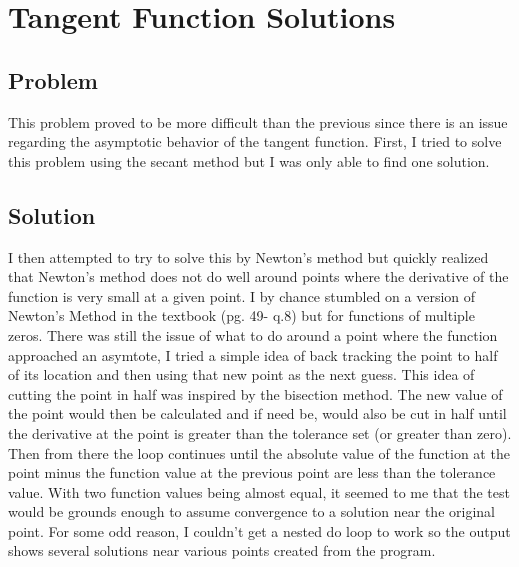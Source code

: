 \documentclass[12pt]{article}
\begin{document}
\section{Tangent Function Solutions}
\subsection{Problem}
This problem proved to be more difficult than the previous since there is an issue regarding the asymptotic behavior of the tangent function. First, I tried to solve this problem using the secant method but I was only able to find one solution. 
\subsection{Solution}
I then attempted to try to solve this by Newton's method but quickly realized that Newton's method does not do well around points where the derivative of the function is very small at a given point. I by chance stumbled on a version of Newton's Method in the textbook (pg. 49- q.8) but for functions of multiple zeros. There was still the issue of what to do around a point where the function approached an asymtote, I tried a simple idea of back tracking the point to half of its location and then using that new point as the next guess. This idea of cutting the point in half was inspired by the bisection method. The new value of the point would then be calculated and if need be, would also be cut in half until the derivative at the point is greater than the tolerance set (or greater than zero). Then from there the loop continues until the absolute value of the function at the point minus the function value at the previous point are less than the tolerance value. With two function values being almost equal, it seemed to me that the test would be grounds enough to assume convergence to a solution near the original point. For some odd reason, I couldn't get a nested do loop to work so the output shows several solutions near various points created from the program.
\end{document}
